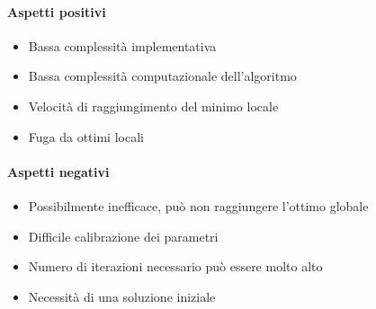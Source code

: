 \noindent \paragraph{Aspetti positivi}
\begin{itemize}
    \item Bassa complessità implementativa
    \item Bassa complessità computazionale dell'algoritmo
    \item Velocità di raggiungimento del minimo locale
    \item Fuga da ottimi locali
\end{itemize}

\noindent \paragraph{Aspetti negativi}
\begin{itemize}
    \item Possibilmente inefficace, può non raggiungere l'ottimo globale
    \item Difficile calibrazione dei parametri
    \item Numero di iterazioni necessario può essere molto alto
    \item Necessità di una soluzione iniziale
\end{itemize}
